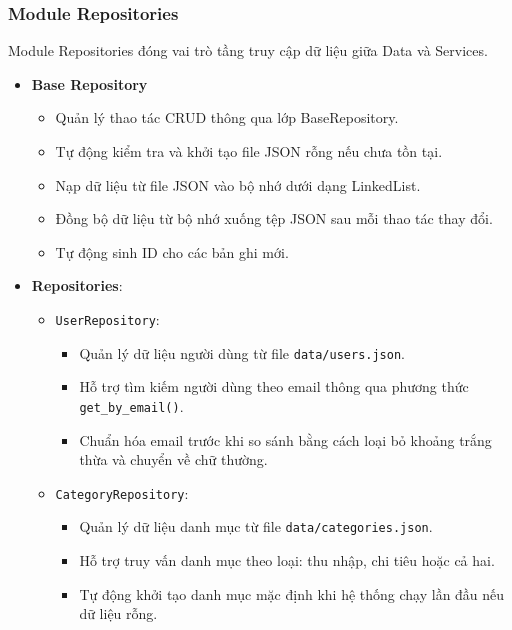 \documentclass[12pt,letterpaper]{article}
\begin{document}
\subsubsection{Module Repositories}

Module Repositories đóng vai trò tầng truy cập dữ liệu giữa Data và Services.

\begin{itemize}
\item \textbf{Base Repository}
\begin{itemize}
\item Quản lý thao tác CRUD thông qua lớp BaseRepository.
\item Tự động kiểm tra và khởi tạo file JSON rỗng nếu chưa tồn tại.

\item Nạp dữ liệu từ file JSON vào bộ nhớ dưới dạng LinkedList.

\item Đồng bộ dữ liệu từ bộ nhớ xuống tệp JSON sau mỗi thao tác thay đổi.

\item Tự động sinh ID cho các bản ghi mới.
\end{itemize}
\item \textbf{Repositories}:

\begin{itemize}
    \item \texttt{UserRepository}:
    \begin{itemize}
        \item Quản lý dữ liệu người dùng từ file \texttt{data/users.json}.
        \item Hỗ trợ tìm kiếm người dùng theo email thông qua phương thức \texttt{get\_by\_email()}.
        \item Chuẩn hóa email trước khi so sánh bằng cách loại bỏ khoảng trắng thừa và chuyển về chữ thường.
    \end{itemize}

    \item \texttt{CategoryRepository}:
    \begin{itemize}
        \item Quản lý dữ liệu danh mục từ file \texttt{data/categories.json}.
        \item Hỗ trợ truy vấn danh mục theo loại: thu nhập, chi tiêu hoặc cả hai.
        \item Tự động khởi tạo danh mục mặc định khi hệ thống chạy lần đầu nếu dữ liệu rỗng.
    \end{itemize}


\end{itemize}
\end{itemize}
\end{document}
